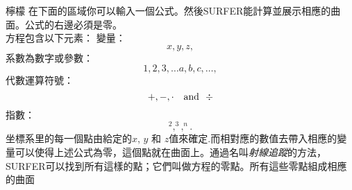 \begin{surferPage}{檸檬}
在下面的區域你可以輸入一個公式。然後SURFER能計算並展示相應的曲面。公式的右邊必須是零。
\\
方程包含以下元素：
\newline
變量：
\[x, y, z, \]
系數為數字或參數：
\[1, 2, 3, \dots a, b, c, \dots, \]
代數運算符號：
\[+,  - , \cdot \quad \textnormal{and}\ \ \div\]
指數：
\[ ^2, ^3, ^n .\]
坐標系里的每一個點由給定的$x$, $y$ 和 $z$值來確定.而相對應的數值去帶入相應的變量可以使得上述公式為零，這個點就在曲面上。通過名叫\textit{射線追蹤}的方法，SURFER可以找到所有這樣的點；它們叫做方程的零點。所有這些零點組成相應的曲面
\end{surferPage}
